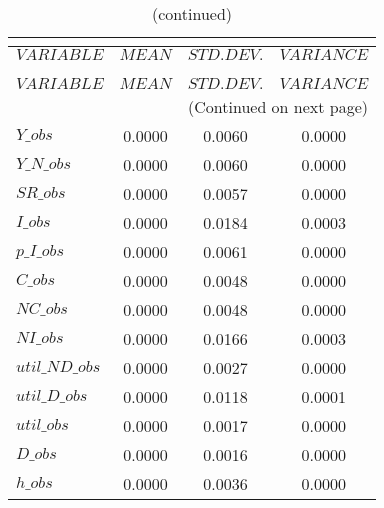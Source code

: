  
\begin{center}
\begin{longtable}{lccc} 
\caption{THEORETICAL MOMENTS}\\
 \label{Table:th_moments}\\
\toprule 
$VARIABLE       $	 & 	 $         MEAN$	 & 	 $    STD. DEV.$	 & 	 $     VARIANCE$\\
\midrule \endfirsthead 
\caption{(continued)}\\
 \toprule \\ 
$VARIABLE       $	 & 	 $         MEAN$	 & 	 $    STD. DEV.$	 & 	 $     VARIANCE$\\
\midrule \endhead 
\midrule \multicolumn{4}{r}{(Continued on next page)} \\ \bottomrule \endfoot 
\bottomrule \endlastfoot 
$Y\_obs         $	 & 	       0.0000	 & 	       0.0060	 & 	       0.0000 \\ 
$Y\_N\_obs      $	 & 	       0.0000	 & 	       0.0060	 & 	       0.0000 \\ 
$SR\_obs        $	 & 	       0.0000	 & 	       0.0057	 & 	       0.0000 \\ 
$I\_obs         $	 & 	       0.0000	 & 	       0.0184	 & 	       0.0003 \\ 
$p\_I\_obs      $	 & 	       0.0000	 & 	       0.0061	 & 	       0.0000 \\ 
$C\_obs         $	 & 	       0.0000	 & 	       0.0048	 & 	       0.0000 \\ 
$NC\_obs        $	 & 	       0.0000	 & 	       0.0048	 & 	       0.0000 \\ 
$NI\_obs        $	 & 	       0.0000	 & 	       0.0166	 & 	       0.0003 \\ 
$util\_ND\_obs  $	 & 	       0.0000	 & 	       0.0027	 & 	       0.0000 \\ 
$util\_D\_obs   $	 & 	       0.0000	 & 	       0.0118	 & 	       0.0001 \\ 
$util\_obs      $	 & 	       0.0000	 & 	       0.0017	 & 	       0.0000 \\ 
$D\_obs         $	 & 	       0.0000	 & 	       0.0016	 & 	       0.0000 \\ 
$h\_obs         $	 & 	       0.0000	 & 	       0.0036	 & 	       0.0000 \\ 
\end{longtable}
 \end{center}
